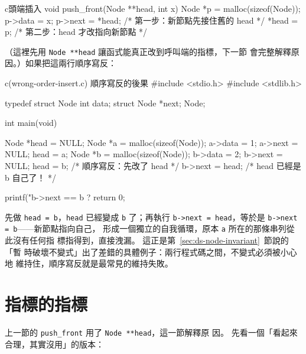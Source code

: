 \begin{code}{c}{頭端插入}
void push_front(Node **head, int x) {
    Node *p = malloc(sizeof(Node));
    p->data = x;
    p->next = *head; /* 第一步：新節點先接住舊的 head */
    *head = p;        /* 第二步：head 才改指向新節點 */
}
\end{code}

（這裡先用 \texttt{Node **head} 讓函式能真正改到呼叫端的指標，下一節
會完整解釋原因。）如果把這兩行順序寫反：

\begin{example}{c}{(wrong-order-insert.c) 順序寫反的後果}
#include <stdio.h>
#include <stdlib.h>

typedef struct Node {
    int data;
    struct Node *next;
} Node;

int main(void) {
    Node *head = NULL;
    Node *a = malloc(sizeof(Node)); a->data = 1; a->next = NULL;
    head = a;
    Node *b = malloc(sizeof(Node)); b->data = 2; b->next = NULL;
    head = b;        /* 順序寫反：先改了 head */
    b->next = head;  /* head 已經是 b 自己了！ */

    printf("b->next == b ? %
    return 0;
}
\end{example}


先做 \texttt{head = b}，\texttt{head} 已經變成 \texttt{b} 了；再執行
\texttt{b->next = head}，等於是 \texttt{b->next = b}——新節點指向自己，
形成一個獨立的自我循環，原本 \texttt{a} 所在的那條串列從此沒有任何指
標指得到，直接洩漏。 這正是第~\ref{sec:ds-node-invariant}~節說的「暫
時破壞不變式」出了差錯的具體例子：兩行程式碼之間，不變式必須被小心地
維持住，順序寫反就是最常見的維持失敗。


\section{指標的指標}
\label{sec:ds-pointer-to-pointer}

上一節的 \texttt{push\_front} 用了 \texttt{Node **head}，這一節解釋原
因。 先看一個「看起來合理，其實沒用」的版本：

